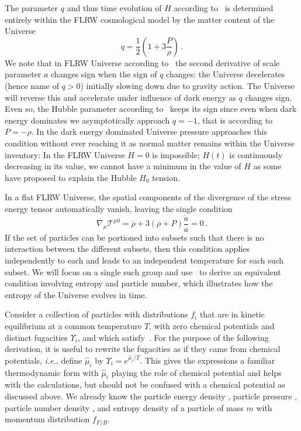 The parameter $q$ and thus time evolution of $H$ according to~ is determined entirely within the FLRW cosmological model by the matter content of the Universe
\begin{equation}\label{qparam}
q=\frac 1 2 \left(1+3\frac{P}{\rho}\right)\,.
\end{equation}
We note that in FLRW Universe according to~ the second derivative of scale parameter $a$ changes sign when the sign of $q$ changes: the Universe decelerates (hence name of $q>0$) initially slowing down due to gravity action. The Universe will reverse this and accelerate under influence of dark energy as $q$ changes sign. Even so, the Hubble parameter according to~ keeps its sign since even when dark energy dominates we asymptotically approach $q=-1$, that is according to~ $P=-\rho$. In the dark energy dominated Universe pressure approaches this condition without ever reaching it as normal matter remains within the Universe inventory: In the FLRW Universe $\dot H=0$ is impossible; $H(t)$ is continuously decreasing in its value, we cannot have a minimum in the value of $H$ as some have proposed to explain the Hubble $H_0$ tension. 

In a flat FLRW Universe, the spatial components of the divergence of the stress energy tensor automatically vanish, leaving the single condition
\begin{equation}\label{stress_energy_eq}
\nabla_\mu \mathcal{T}^{\mu 0}=\dot{\rho}+3\left(\rho+P\right)\frac{\dot{a}}{a}=0\,.
\end{equation}
If the set of particles can be portioned into subsets such that there is no interaction between the different subsets, then this condition applies independently to each and leads to an independent temperature for each such subset. We will focus on a single such group and use~ to derive an equivalent condition involving entropy and particle number, which illustrates how the entropy of the Universe evolves in time. 

Consider a collection of particles with distributions $f_i$ that are in kinetic equilibrium  at a common temperature $T$, with zero chemical potentials and distinct fugacities $\Upsilon_i$, and which satisfy~. For the purpose of the following derivation, it is useful to rewrite the fugacities as if they came from chemical potentials, {\it i.e.\/}, define $\hat{\mu}_i$ by $\Upsilon_i=e^{\hat{\mu}_i/T}$. This gives the expressions a familiar thermodynamic form with $\hat{\mu}_i$ playing the role of chemical potential and helps with the calculations, but should not be confused with a chemical potential as discussed above. We already know the particle energy density , particle pressure , particle number density , and entropy density  of a particle of mass $m$ with momentum distribution $f_{F/B}$.


